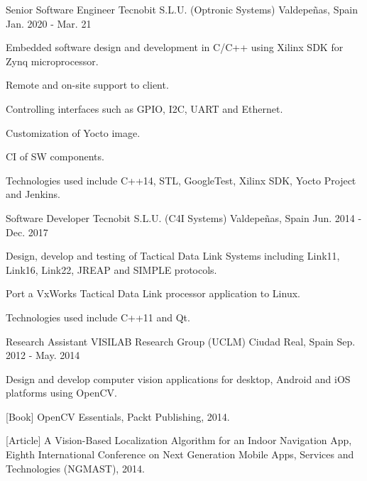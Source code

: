\begin{cventries}
  \cventry
    {Senior Software Engineer} %
    {Tecnobit S.L.U. (Optronic Systems)} %
    {Valdepeñas, Spain} %
    {Jan. 2020 - Mar. 21} %
    {
      \begin{cvitems} %
        \item {Embedded software design and development in C/C++ using Xilinx SDK for Zynq microprocessor.}
        \item {Remote and on-site support to client.}
        \item {Controlling interfaces such as GPIO,  I2C, UART and Ethernet.}
        \item {Customization of Yocto image.}
        \item {CI of SW components.}
        \item {Technologies used include C++14, STL, GoogleTest, Xilinx SDK, Yocto Project and Jenkins.}
      \end{cvitems}
    }

  \cventry
    {Software Developer} %
    {Tecnobit S.L.U. (C4I Systems)} %
    {Valdepeñas, Spain} %
    {Jun. 2014 - Dec. 2017} %
    {
      \begin{cvitems} %
        \item {Design, develop and testing of Tactical Data Link Systems including Link11, Link16, Link22, JREAP and SIMPLE protocols.}
        \item {Port a VxWorks Tactical Data Link processor application to Linux.}
        \item {Technologies used include C++11 and Qt.}
      \end{cvitems}
    }


  \cventry
    {Research Assistant} %
    {VISILAB Research Group (UCLM)} %
    {Ciudad Real, Spain} %
    {Sep. 2012 - May. 2014} %
    {
      \begin{cvitems} %
        \item {Design and develop computer vision applications for desktop, Android and iOS platforms using OpenCV.}
        \item {[Book] OpenCV Essentials, Packt Publishing, 2014.}
        \item {[Article] A Vision-Based Localization Algorithm for an Indoor Navigation App, Eighth International Conference on Next Generation Mobile Apps, Services and Technologies (NGMAST), 2014.}
      \end{cvitems}
    }




\end{cventries}
